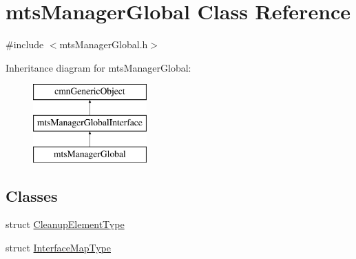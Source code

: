 \hypertarget{classmts_manager_global}{}\section{mts\+Manager\+Global Class Reference}
\label{classmts_manager_global}


{\ttfamily \#include $<$mts\+Manager\+Global.\+h$>$}

Inheritance diagram for mts\+Manager\+Global\+:\begin{figure}[H]
\begin{center}
\leavevmode
\includegraphics[height=3.000000cm]{d1/d06/classmts_manager_global}
\end{center}
\end{figure}
\subsection*{Classes}
\begin{DoxyCompactItemize}
\item 
struct \hyperlink{structmts_manager_global_1_1_cleanup_element_type}{Cleanup\+Element\+Type}
\item 
struct \hyperlink{structmts_manager_global_1_1_interface_map_type}{Interface\+Map\+Type}
\end{DoxyCompactItemize}
